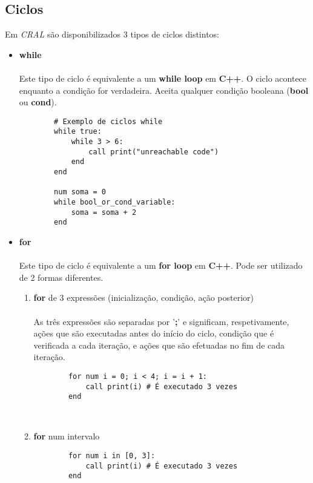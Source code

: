 \documentclass{report}
\begin{document}
\subsection{Ciclos}
Em \textit{CRAL} são disponibilizados 3 tipos de ciclos distintos: 
\begin{itemize}
    \item \textbf{while}\\
    \\ Este tipo de ciclo é equivalente a um \textbf{while loop} em \textbf{C++}. O ciclo acontece enquanto a condição for verdadeira. Aceita qualquer condição booleana (\textbf{bool} ou \textbf{cond}).
    \begin{verbatim}
        # Exemplo de ciclos while
        while true:
            while 3 > 6:
                call print("unreachable code")
            end
        end
        
        num soma = 0
        while bool_or_cond_variable:
            soma = soma + 2
        end
    \end{verbatim}
    \item \textbf{for}\\
    \\ Este tipo de ciclo é equivalente a um \textbf{for loop} em \textbf{C++}. Pode ser utilizado de 2 formas diferentes.
    \begin{enumerate}
        \item \textbf{for} de 3 expressões (inicialização, condição, ação posterior)\\
        \\As três expressões são separadas por '\textbf{;}' e significam, respetivamente, ações que são executadas antes do início do ciclo, condição que é verificada a cada iteração, e ações que são efetuadas no fim de cada iteração.\\ 
        \begin{verbatim}
        for num i = 0; i < 4; i = i + 1:
            call print(i) # É executado 3 vezes
        end
        \end{verbatim}\\
        \vspace{3mm}
        \item \textbf{for} num intervalo
        \begin{verbatim}
        for num i in [0, 3]:
            call print(i) # É executado 3 vezes
        end
        \end{verbatim}
    \end{enumerate}
    

\end{itemize}
\end{document}
